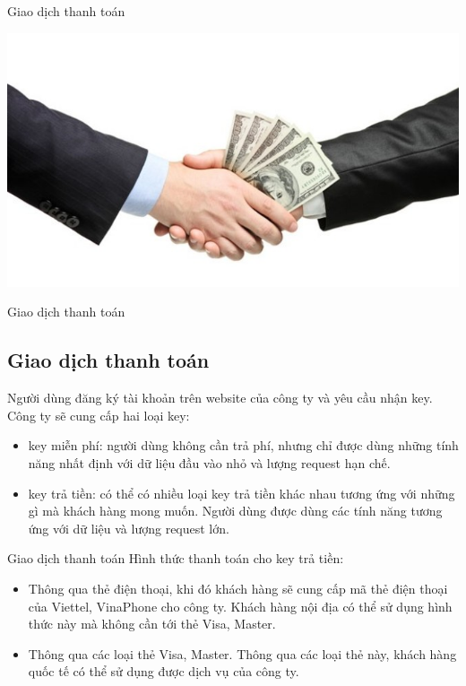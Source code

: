 \documentclass{beamer}
\begin{document}
\begin{frame}{Giao dịch thanh toán}
\begin{center}
\includegraphics[scale=0.4]{giaodich.jpg}
\end{center}
\end{frame}
\begin{frame}{Giao dịch thanh toán}
\subsection{Giao dịch thanh toán}


Người dùng đăng ký tài khoản trên website của công ty và yêu cầu nhận key.\\
Công ty sẽ cung cấp hai loại key:
\begin{itemize}
\item key miễn phí: người dùng không cần trả phí, nhưng chỉ được dùng những tính năng nhất định với dữ liệu đầu vào nhỏ và lượng request hạn chế.
\item key trả tiền: có thể có nhiều loại key trả tiền khác nhau tương ứng với những gì mà khách hàng mong muốn. Người dùng được dùng các tính năng tương ứng với dữ liệu và lượng request lớn. 
\end{itemize}
\end{frame}
\begin{frame}{Giao dịch thanh toán}
Hình thức thanh toán cho key trả tiền: \\
\begin{itemize}
\item Thông qua thẻ điện thoại, khi đó khách hàng sẽ cung cấp mã thẻ điện thoại của Viettel, VinaPhone cho công ty. Khách hàng nội địa có thể sử dụng hình thức này mà không cần tới thẻ Visa, Master.
\item Thông qua các loại thẻ Visa, Master. Thông qua các loại thẻ này, khách hàng quốc tế có thể sử dụng được dịch vụ của công ty.

\end{itemize}


\end{frame}
\end{document}
